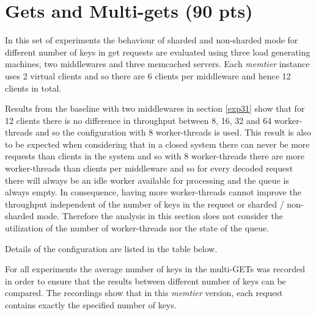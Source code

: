 \documentclass[report.tex]{subfiles}
\begin{document}
\section{Gets and Multi-gets (90 pts)}


In this set of experiments the behaviour of sharded and non-sharded mode for different number of keys in get requests are evaluated using three load generating machines, two middlewares and three memcached servers.
Each \emph{memtier} instance uses 2 virtual clients and so there are 6 clients per middleware and hence 12 clients in total. 

Results from the baseline with two middlewares in section \ref{exp31} show that for 12 clients there is no difference in throughput between 8, 16, 32 and 64 worker-threads and so the configuration with 8 worker-threads is used. This result is also to be expected when considering that in a closed system there can never be more requests than clients in the system and so with 8 worker-threads there are more worker-threads than clients per middleware and so for every decoded request there will always be an idle worker available for processing and the queue is always empty. In consequence, having more worker-threads cannot improve the throughput independent of the number of keys in the request or sharded / non-sharded mode. Therefore the analysis in this section does not consider the utilization of the number of worker-threads nor the state of the queue.

Details of the configuration are listed in the table below.

For all experiments the average number of keys in the multi-GETs was recorded in order to ensure that the results between different number of keys can be compared. The recordings show that in this \emph{memtier} version, each request contains exactly the specified number of keys.
\end{document}
